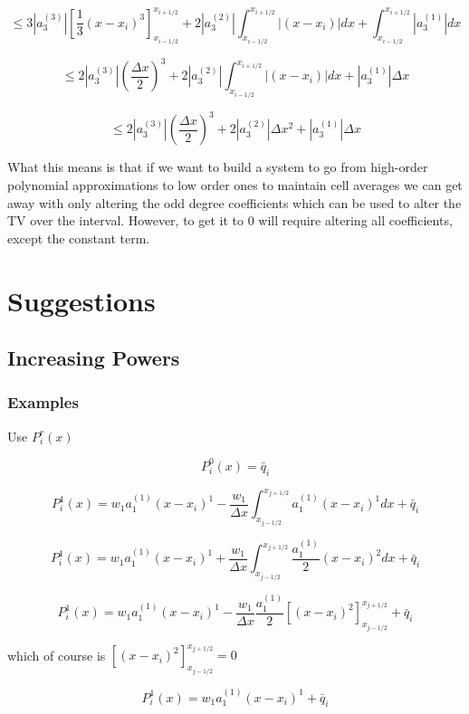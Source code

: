 \documentclass[10pt]{article}
\begin{document}
\[ \le 3 \left|a^{(3)}_3 \right| \left[\frac{1}{3}(x  - x_i)^3\right]_{x_{i-1/2}}^{x_{i+1/2}}  +  2\left| a^{(2)}_3\right| \int_{x_{i-1/2}}^{x_{i+1/2}}  \left|(x  - x_i)\right|dx  +  \int_{x_{i-1/2}}^{x_{i+1/2}} \left|a^{(1)}_3\right| dx\]


\[ \le 2 \left|a^{(3)}_3\right|\left(\frac{\Delta x}{2}\right)^3   +  2\left| a^{(2)}_3\right| \int_{x_{i-1/2}}^{x_{i+1/2}}  \left|(x  - x_i)\right|dx  +   \left|a^{(1)}_3\right| \Delta x \]

\[ \le 2 \left|a^{(3)}_3\right|\left(\frac{\Delta x}{2}\right)^3   +  2\left| a^{(2)}_3\right| \Delta x ^2 +   \left|a^{(1)}_3\right| \Delta x \]

What this means is that if we want to build a system to go from high-order polynomial approximations to low order ones to maintain cell averages we can get away with only altering the odd degree coefficients which can be used to alter the TV over the interval. However, to get it to $0$ will require altering all coefficients, except the constant term. 


\section{Suggestions}

\subsection{Increasing Powers}

\subsubsection{Examples}
Use $P^r_i\left(x\right)$

\[P^0_i(x) = \bar{q}_i\]

\[P^1_i(x) = w_1 a^{(1)}_1(x  - x_i)^1  - \frac{ w_1}{\Delta x}\int_{x_{j-1/2}}^{x_{j+1/2}}a^{(1)}_1(x  - x_i)^1 dx +  \bar{q}_i\]


\[P^1_i(x) = w_1 a^{(1)}_1(x  - x_i)^1 + \frac{ w_1}{\Delta x}\int_{x_{j-1/2}}^{x_{j+1/2}} \frac{a^{(1)}_1}{2}(x  - x_i)^2 dx +  \bar{q}_i\]

\[P^1_i(x) = w_1 a^{(1)}_1(x  - x_i)^1 - \frac{ w_1}{\Delta x} \frac{a^{(1)}_1}{2 }\left[(x  - x_i)^2\right]_{x_{j-1/2}}^{x_{j+1/2}}  +  \bar{q}_i\]

which of course is $\left[(x  - x_i)^2\right]_{x_{j-1/2}}^{x_{j+1/2}} = 0 $

\[P^1_i(x) = w_1 a^{(1)}_1(x  - x_i)^1   +  \bar{q}_i\]
\end{document}
